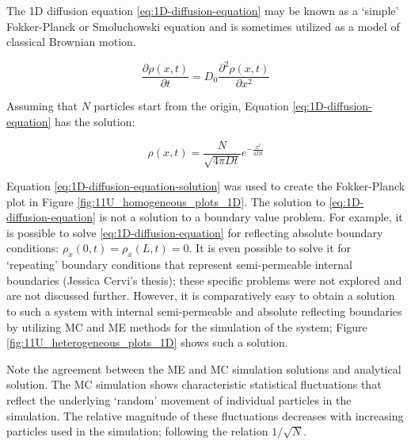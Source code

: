 	The 1D diffusion equation \ref{eq:1D-diffusion-equation} may be known as a `simple' Fokker-Planck or Smoluchowski equation and is sometimes utilized as a model of classical Brownian motion.
	
	\begin{equation}
	\label{eq:1D-diffusion-equation}
		\frac{\partial\rho(x,t)}{\partial t} = D_0 \frac{\partial^2 \rho(x,t)}{\partial x^2}
	\end{equation}
	
	Assuming that $ N $ particles start from the origin, Equation \ref{eq:1D-diffusion-equation} has the solution:
	
	\begin{equation}
	\label{eq:1D-diffusion-equation-solution}
		\rho(x,t)=\frac{N}{\sqrt{4\pi Dt}}e^{-\frac{x^2}{4Dt}}
	\end{equation}	
	
	Equation \ref{eq:1D-diffusion-equation-solution} was used to create the Fokker-Planck plot in Figure \ref{fig:11U_homogeneous_plots_1D}. The solution to \ref{eq:1D-diffusion-equation} is not a solution to a boundary value problem. For example, it is possible to solve \ref{eq:1D-diffusion-equation} for reflecting absolute boundary conditions: $ \rho_x(0,t) = \rho_x(L,t) = 0 $. It is even possible to solve it for `repeating' boundary conditions that represent semi-permeable internal boundaries (Jessica Cervi's thesis); these specific problems were not explored and are not discussed further. However, it is comparatively easy to obtain a solution to such a system with internal semi-permeable and absolute reflecting boundaries by utilizing MC and ME methods for the simulation of the system; Figure \ref{fig:11U_heterogeneous_plots_1D} shows such a solution.
	
	Note the agreement between the ME and MC simulation solutions and analytical solution. The MC simulation shows characteristic statistical fluctuations that reflect the underlying `random' movement of individual particles in the simulation. The relative magnitude of these fluctuations decreases with increasing particles used in the simulation; following the relation $ 1/\sqrt{N} $.

